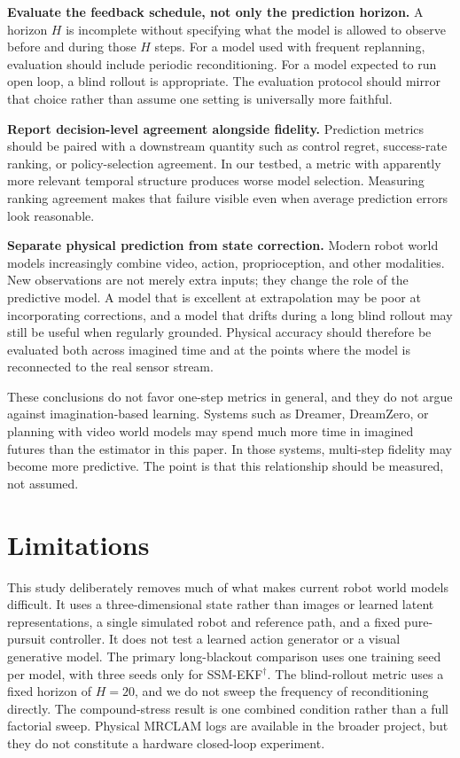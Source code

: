 \documentclass{article}
\begin{document}
\textbf{Evaluate the feedback schedule, not only the prediction horizon.} A horizon $H$ is incomplete without specifying what the model is allowed to observe before and during those $H$ steps. For a model used with frequent replanning, evaluation should include periodic reconditioning. For a model expected to run open loop, a blind rollout is appropriate. The evaluation protocol should mirror that choice rather than assume one setting is universally more faithful.

\textbf{Report decision-level agreement alongside fidelity.} Prediction metrics should be paired with a downstream quantity such as control regret, success-rate ranking, or policy-selection agreement. In our testbed, a metric with apparently more relevant temporal structure produces worse model selection. Measuring ranking agreement makes that failure visible even when average prediction errors look reasonable.

\textbf{Separate physical prediction from state correction.} Modern robot world models increasingly combine video, action, proprioception, and other modalities. New observations are not merely extra inputs; they change the role of the predictive model. A model that is excellent at extrapolation may be poor at incorporating corrections, and a model that drifts during a long blind rollout may still be useful when regularly grounded. Physical accuracy should therefore be evaluated both across imagined time and at the points where the model is reconnected to the real sensor stream.

These conclusions do not favor one-step metrics in general, and they do not argue against imagination-based learning. Systems such as Dreamer, DreamZero, or planning with video world models may spend much more time in imagined futures than the estimator in this paper. In those systems, multi-step fidelity may become more predictive. The point is that this relationship should be measured, not assumed.

\section{Limitations}

This study deliberately removes much of what makes current robot world models difficult. It uses a three-dimensional state rather than images or learned latent representations, a single simulated robot and reference path, and a fixed pure-pursuit controller. It does not test a learned action generator or a visual generative model. The primary long-blackout comparison uses one training seed per model, with three seeds only for SSM-EKF$^\dagger$. The blind-rollout metric uses a fixed horizon of $H=20$, and we do not sweep the frequency of reconditioning directly. The compound-stress result is one combined condition rather than a full factorial sweep. Physical MRCLAM logs are available in the broader project, but they do not constitute a hardware closed-loop experiment.
\end{document}

